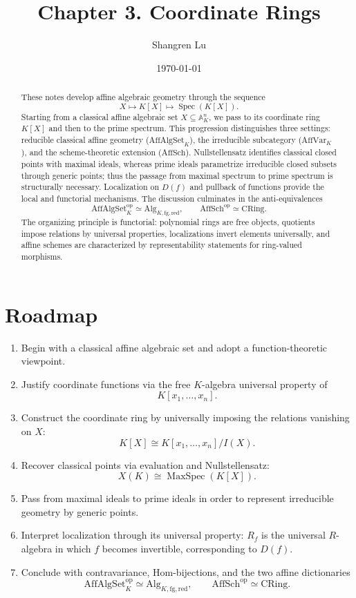 \documentclass[12pt, a4paper]{article}
\title{\textbf{Chapter 3. Coordinate Rings}}
\author{Shangren Lu}
\date{\today}
\theoremstyle{definition}
\DeclareMathOperator{\Spec}{Spec}
\DeclareMathOperator{\MaxSpec}{MaxSpec}
\newcommand{\A}{\mathbb{A}}
\newcommand{\AffAlgSetK}{\mathrm{AffAlgSet}_K}
\newcommand{\AffVarK}{\mathrm{AffVar}_K}
\newcommand{\AlgKfgred}{\mathrm{Alg}_{K,\mathrm{fg},\mathrm{red}}}
\newcommand{\AffSch}{\mathrm{AffSch}}
\newcommand{\CRing}{\mathrm{CRing}}
\begin{document}
\maketitle

\begin{abstract}
These notes develop affine algebraic geometry through the sequence
\[
\boxed{X \longmapsto K[X] \longmapsto \Spec(K[X]).}
\]
Starting from a classical affine algebraic set $X\subseteq \A_K^n$, we pass to its coordinate ring $K[X]$ and then to the prime spectrum. This progression distinguishes three settings: reducible classical affine geometry ($\AffAlgSetK$), the irreducible subcategory ($\AffVarK$), and the scheme-theoretic extension ($\AffSch$). Nullstellensatz identifies classical closed points with maximal ideals, whereas prime ideals parametrize irreducible closed subsets through generic points; thus the passage from maximal spectrum to prime spectrum is structurally necessary. Localization on $D(f)$ and pullback of functions provide the local and functorial mechanisms. The discussion culminates in the anti-equivalences
\[
\AffAlgSetK^{\mathrm{op}}\simeq \AlgKfgred,
\qquad
\AffSch^{\mathrm{op}}\simeq \CRing.
\]
The organizing principle is functorial: polynomial rings are free objects, quotients impose relations by universal properties, localizations invert elements universally, and affine schemes are characterized by representability statements for ring-valued morphisms.
\end{abstract}

\tableofcontents
\newpage

\section{Roadmap}

\begin{enumerate}[label=\arabic*., leftmargin=2em]
    \item Begin with a classical affine algebraic set and adopt a function-theoretic viewpoint.
    \item Justify coordinate functions via the free $K$-algebra universal property of
    \[
    K[x_1,\dots,x_n].
    \]
    \item Construct the coordinate ring by universally imposing the relations vanishing on $X$:
    \[
    K[X]\cong K[x_1,\dots,x_n]/I(X).
    \]
    \item Recover classical points via evaluation and Nullstellensatz:
    \[
    X(K)\cong \MaxSpec(K[X]).
    \]
    \item Pass from maximal ideals to prime ideals in order to represent irreducible geometry by generic points.
    \item Interpret localization through its universal property: $R_f$ is the universal $R$-algebra in which $f$ becomes invertible, corresponding to $D(f)$.
    \item Conclude with contravariance, Hom-bijections, and the two affine dictionaries
    \[
    \AffAlgSetK^{\mathrm{op}}\simeq \AlgKfgred,
    \qquad
    \AffSch^{\mathrm{op}}\simeq \CRing.
    \]
\end{enumerate}
\end{document}
